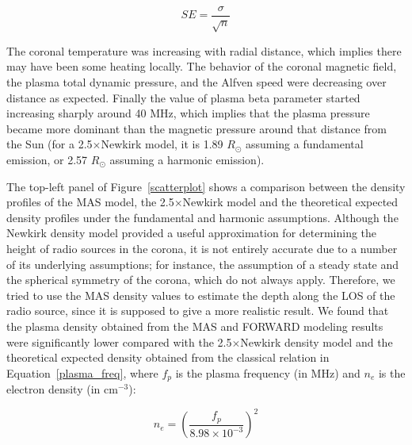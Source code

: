 \begin{equation}
    SE = \frac{\sigma}{\sqrt{n}}
\label{error}
\end{equation}

The coronal temperature was increasing with radial distance, which implies there may have been some heating locally.
The behavior of the coronal magnetic field, the plasma total dynamic pressure, and the Alfven speed were decreasing over distance as expected.
Finally the value of plasma beta parameter started increasing sharply around 40 MHz, which implies that the plasma pressure became more dominant than the magnetic pressure around that distance from the Sun (for a 2.5$\times$Newkirk model, it is 1.89 $R_\odot$ assuming a fundamental emission, or 2.57 $R_\odot$ assuming a harmonic emission).

The top-left panel of Figure~\ref{scatterplot} shows a comparison between the density profiles of the MAS model, the 2.5$\times$Newkirk model and the theoretical expected density profiles under the fundamental and harmonic assumptions.
Although the Newkirk density model provided a useful approximation for determining the height of radio sources in the corona, it is not entirely accurate due to a number of its underlying assumptions; for instance, the assumption of a steady state and the spherical symmetry of the corona, which do not always apply. Therefore, we tried to use the MAS density values to estimate the depth along the LOS of the radio source, since it is supposed to give a more realistic result.
We found that the plasma density obtained from the MAS and FORWARD modeling results were significantly lower compared with the 2.5$\times$Newkirk density model and the theoretical expected density obtained from the classical relation in Equation~\ref{plasma_freq}, where $f_p$ is the plasma frequency (in MHz) and $n_e$ is the electron density (in cm$^{-3}$):

\begin{equation}
    n_e = \left(\frac{f_p}{8.98 \times 10^{-3}}\right)^2
\label{plasma_freq}
\end{equation}

